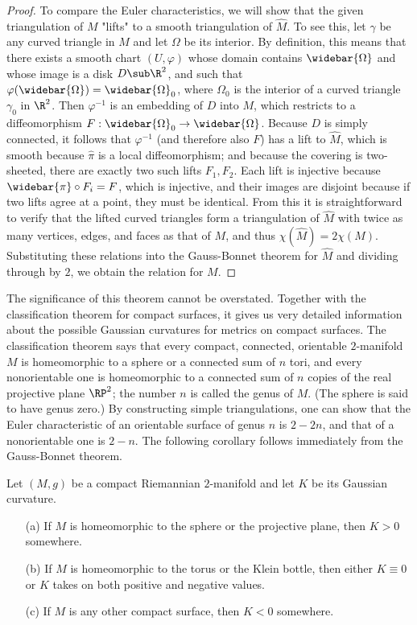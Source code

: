 \begin{proof}
To compare the Euler characteristics, we will show that the given triangulation of $M$ "lifts" to a smooth triangulation of $\widehat{M}$. To see this, let $\gamma$ be any curved triangle in $M$ and let $\Omega$ be its interior. By definition, this means that there exists a smooth chart $(U,\varphi)$ whose domain contains $\widebar{\Omega}$ and whose image is a disk $D\sub\R^2$, and such that $\varphi(\widebar{\Omega})=\widebar{\Omega}_0$, where $\Omega_0$ is the interior of a curved triangle $\gamma_0$ in $\R^2$. Then $\varphi^{-1}$ is an embedding of $D$ into $M$, which restricts to a diffeomorphism $F:\widebar{\Omega}_0\to\widebar{\Omega}$. Because $D$ is simply connected, it follows that $\varphi^{-1}$ (and therefore also $F$) has a lift to $\widehat{M}$, which is smooth because $\widehat{\pi}$ is a local diffeomorphism; and because the covering is two-sheeted, there are exactly two such lifts $F_1,F_2$. Each lift is injective because $\widebar{\pi}\circ F_i=F$, which is injective, and their images are disjoint because if two lifts agree at a point, they must be identical. From this it is straightforward to verify that the lifted curved triangles form a triangulation of $\widehat{M}$ with twice as many vertices, edges, and faces as that of $M$, and thus $\chi(\widehat{M})=2\chi(M)$. Substituting these relations into the Gauss-Bonnet theorem for $\widehat{M}$ and dividing through by $2$, we obtain the relation for $M$.
\end{proof}
The significance of this theorem cannot be overstated. Together with the classification theorem for compact surfaces, it gives us very detailed information about the possible Gaussian curvatures for metrics on compact surfaces. The classification theorem says that every compact, connected, orientable $2$-manifold $M$ is homeomorphic to a sphere or a connected sum of $n$ tori, and every nonorientable one is homeomorphic to a connected sum of $n$ copies of the real projective plane $\RP^2$; the number $n$ is called the genus of $M$. (The sphere is said to have genus zero.) By constructing simple triangulations, one can show that the Euler characteristic of an orientable surface of genus $n$ is $2-2n$, and that of a nonorientable one is $2-n$. The following corollary follows immediately from the Gauss-Bonnet theorem.
\begin{corollary}\label{Riemann surface topology to curvature}
Let $(M,g)$ be a compact Riemannian $2$-manifold and let $K$ be its Gaussian curvature.
\begin{itemize}
\item[(a)] If $M$ is homeomorphic to the sphere or the projective plane, then $K>0$ somewhere.
\item[(b)] If $M$ is homeomorphic to the torus or the Klein bottle, then either $K\equiv 0$ or $K$ takes on both positive and negative values.
\item[(c)] If $M$ is any other compact surface, then $K<0$ somewhere.
\end{itemize}
\end{corollary}
